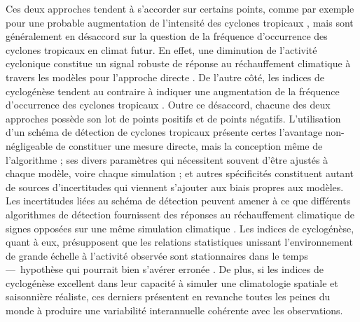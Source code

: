 \documentclass[../main.tex]{subfiles}
\begin{document}
Ces deux approches tendent à s'accorder sur certains points, comme par exemple pour une probable augmentation de l'intensité des cyclones tropicaux
\parencite{sobel_human_2016,bhatia_projected_2018}, mais sont généralement en désaccord sur la question de la fréquence d'occurrence des cyclones tropicaux en
climat futur. En effet, une diminution de l'activité cyclonique constitue un signal robuste de réponse au réchauffement climatique à travers les modèles pour
l'approche directe \parencite{christensen_climate_2013,knutson_tropical_2020}. De l'autre côté, les indices de cyclogénèse tendent au contraire à indiquer une
augmentation de la fréquence d'occurrence des cyclones tropicaux \parencite{emanuel_downscaling_2013,camargo_testing_2014}. Outre ce désaccord, chacune des deux
approches possède son lot de points positifs et de points négatifs. L'utilisation d'un schéma de détection de cyclones tropicaux présente certes l'avantage
non-négligeable de constituer une mesure directe, mais la conception même de l'algorithme ; ses divers paramètres qui nécessitent souvent d'être ajustés à
chaque modèle, voire chaque simulation ; et autres spécificités constituent autant de sources d'incertitudes qui viennent s'ajouter aux biais propres aux
modèles. Les incertitudes liées au schéma de détection peuvent amener à ce que différents algorithmes de détection fournissent des réponses au réchauffement
climatique de signes opposées sur une même simulation climatique \parencite{horn_tracking_2014}. Les indices de cyclogénèse, quant à eux, présupposent que les
relations statistiques unissant l'environnement de grande échelle à l'activité observée sont stationnaires dans le temps ---~hypothèse qui pourrait bien
s'avérer erronée \parencite{nolan_increased_2008,murakami_changes_2013}. De plus, si les indices de cyclogénèse excellent dans leur capacité à simuler une
climatologie spatiale et saisonnière réaliste, ces derniers présentent en revanche toutes les peines du monde à produire une variabilité interannuelle cohérente
avec les observations.
\end{document}
